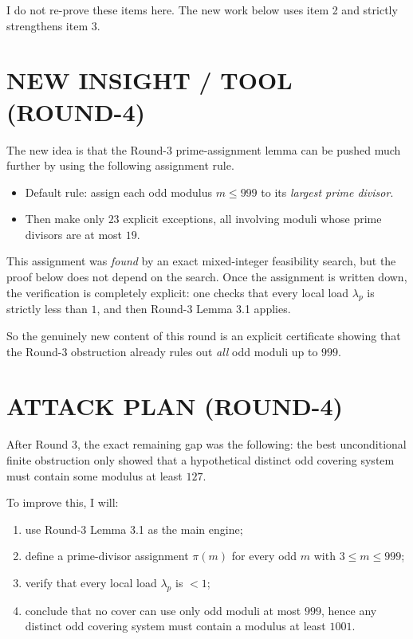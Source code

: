 I do not re-prove these items here. The new work below uses item 2 and strictly strengthens item 3.

\section{NEW INSIGHT / TOOL (ROUND-4)}

The new idea is that the Round-3 prime-assignment lemma can be pushed much further by using the following assignment rule.

\begin{itemize}
\item Default rule: assign each odd modulus \(m\le 999\) to its \emph{largest prime divisor}.
\item Then make only \(23\) explicit exceptions, all involving moduli whose prime divisors are at most \(19\).
\end{itemize}

This assignment was \emph{found} by an exact mixed-integer feasibility search, but the proof below does not depend on the search. Once the assignment is written down, the verification is completely explicit: one checks that every local load \(\lambda_p\) is strictly less than \(1\), and then Round-3 Lemma 3.1 applies.

So the genuinely new content of this round is an explicit certificate showing that the Round-3 obstruction already rules out \emph{all} odd moduli up to \(999\).

\section{ATTACK PLAN (ROUND-4)}

After Round 3, the exact remaining gap was the following: the best unconditional finite obstruction only showed that a hypothetical distinct odd covering system must contain some modulus at least \(127\).

To improve this, I will:

\begin{enumerate}
\item use Round-3 Lemma 3.1 as the main engine;
\item define a prime-divisor assignment \(\pi(m)\) for every odd \(m\) with \(3\le m\le 999\);
\item verify that every local load \(\lambda_p\) is \(<1\);
\item conclude that no cover can use only odd moduli at most \(999\), hence any distinct odd covering system must contain a modulus at least \(1001\).
\end{enumerate}

